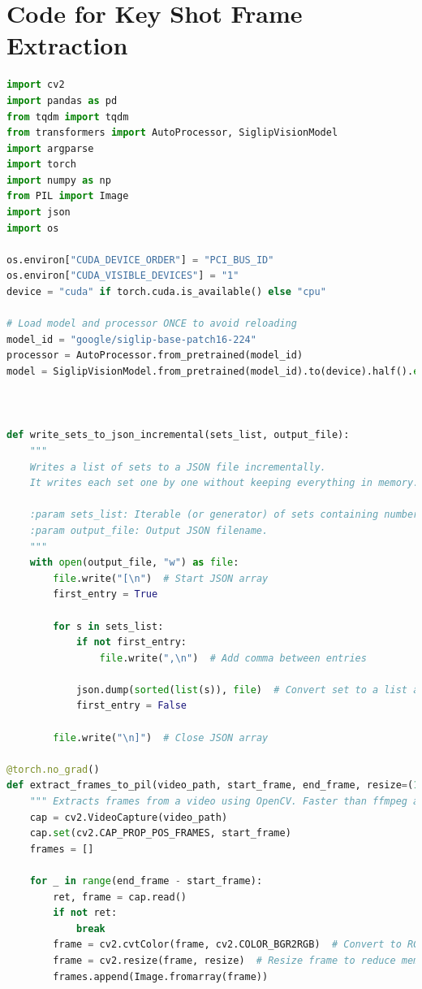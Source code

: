 \documentclass[12pt]{report}
\begin{document}
	\chapter{Code for Key Shot Frame Extraction} \label{app:kse_code}
	\begin{lstlisting}[language=Python,caption={Key Shot Frame Extraction Code}]
import cv2
import pandas as pd
from tqdm import tqdm
from transformers import AutoProcessor, SiglipVisionModel
import argparse
import torch
import numpy as np
from PIL import Image
import json
import os

os.environ["CUDA_DEVICE_ORDER"] = "PCI_BUS_ID"
os.environ["CUDA_VISIBLE_DEVICES"] = "1"
device = "cuda" if torch.cuda.is_available() else "cpu"

# Load model and processor ONCE to avoid reloading
model_id = "google/siglip-base-patch16-224"
processor = AutoProcessor.from_pretrained(model_id)
model = SiglipVisionModel.from_pretrained(model_id).to(device).half().eval()  # Use fp16 precision to reduce memory usage



def write_sets_to_json_incremental(sets_list, output_file):
    """
    Writes a list of sets to a JSON file incrementally.
    It writes each set one by one without keeping everything in memory.

    :param sets_list: Iterable (or generator) of sets containing numbers or strings.
    :param output_file: Output JSON filename.
    """
    with open(output_file, "w") as file:
        file.write("[\n")  # Start JSON array
        first_entry = True
        
        for s in sets_list:
            if not first_entry:
                file.write(",\n")  # Add comma between entries
                
            json.dump(sorted(list(s)), file)  # Convert set to a list and write
            first_entry = False
        
        file.write("\n]")  # Close JSON array

@torch.no_grad()
def extract_frames_to_pil(video_path, start_frame, end_frame, resize=(128, 128)):
    """ Extracts frames from a video using OpenCV. Faster than ffmpeg and resize to reduce memory usage. """
    cap = cv2.VideoCapture(video_path)
    cap.set(cv2.CAP_PROP_POS_FRAMES, start_frame)
    frames = []
    
    for _ in range(end_frame - start_frame):
        ret, frame = cap.read()
        if not ret:
            break
        frame = cv2.cvtColor(frame, cv2.COLOR_BGR2RGB)  # Convert to RGB
        frame = cv2.resize(frame, resize)  # Resize frame to reduce memory usage
        frames.append(Image.fromarray(frame))
    

\end{lstlisting}
\end{document}
